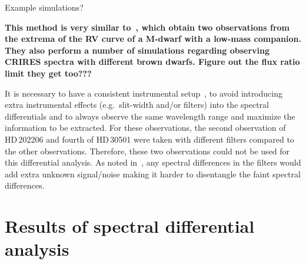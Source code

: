 Example simulations?

\textbf{This method is very similar to~\citet{kostogryz_spectral_2013}, which obtain two observations from the extrema of the {RV} curve of a M-dwarf with a low-mass companion.
They also perform a number of simulations regarding observing {CRIRES} spectra with different brown dwarfs.
Figure out the flux ratio limit they get too???}

It is necessary to have a consistent instrumental setup~\citep{ferluga_separating_1997}, to avoid introducing extra instrumental effects (e.g.\ slit-width and/or filters) into the spectral differentials and to always observe the same wavelength range and maximize the information to be extracted.
For these observations, the second observation of {HD\,202206} and fourth of {HD\,30501} were taken with different filters compared to the other observations.
Therefore, these two observations could not be used for this differential analysis.
As noted in~\citet{hadrava_disentangling_2009}, any spectral differences in the filters would add extra unknown signal/noise making it harder to disentangle the faint spectral differences.


\section{Results of spectral differential analysis}
\label{subsec:differential_results}

